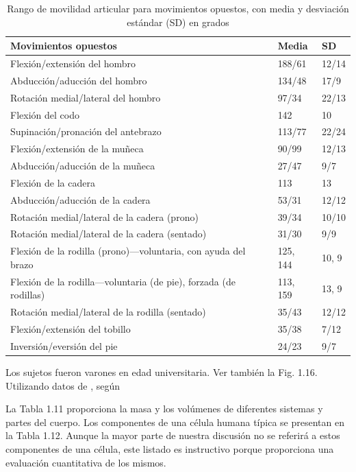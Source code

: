 \documentclass[12pt]{book}
\begin{document}
\begin{table}[htbp]
\centering
\caption{Rango de movilidad articular para movimientos opuestos, con media y desviación estándar (SD) en grados}
\label{tab:110}
\begin{tabularx}{\textwidth}{lXX}
\toprule
\textbf{Movimientos opuestos} & \textbf{Media} & \textbf{SD} \\
\midrule
Flexión/extensión del hombro & 188/61 & 12/14 \\
Abducción/aducción del hombro & 134/48 & 17/9 \\
Rotación medial/lateral del hombro & 97/34 & 22/13 \\
Flexión del codo & 142 & 10 \\
Supinación/pronación del antebrazo & 113/77 & 22/24 \\
Flexión/extensión de la muñeca & 90/99 & 12/13 \\
Abducción/aducción de la muñeca & 27/47 & 9/7 \\
Flexión de la cadera & 113 & 13 \\
Abducción/aducción de la cadera & 53/31 & 12/12 \\
Rotación medial/lateral de la cadera (prono) & 39/34 & 10/10 \\
Rotación medial/lateral de la cadera (sentado) & 31/30 & 9/9 \\
Flexión de la rodilla (prono)---voluntaria, con ayuda del brazo & 125, 144 & 10, 9 \\
Flexión de la rodilla---voluntaria (de pie), forzada (de rodillas) & 113, 159 & 13, 9 \\
Rotación medial/lateral de la rodilla (sentado) & 35/43 & 12/12 \\
Flexión/extensión del tobillo & 35/38 & 7/12 \\
Inversión/eversión del pie & 24/23 & 9/7 \\
\bottomrule
\end{tabularx}
\begin{flushleft}
    \small Los sujetos fueron varones en edad universitaria. Ver también la Fig. 1.16. \\
    Utilizando datos de \cite{10}, según \cite{4, 39}
\end{flushleft}
\end{table}

La Tabla 1.11 proporciona la masa y los volúmenes de diferentes sistemas y partes del cuerpo. Los componentes de una célula humana típica se presentan en la Tabla 1.12. Aunque la mayor parte de nuestra discusión no se referirá a estos componentes de una célula, este listado es instructivo porque proporciona una evaluación cuantitativa de los mismos.
\end{document}

